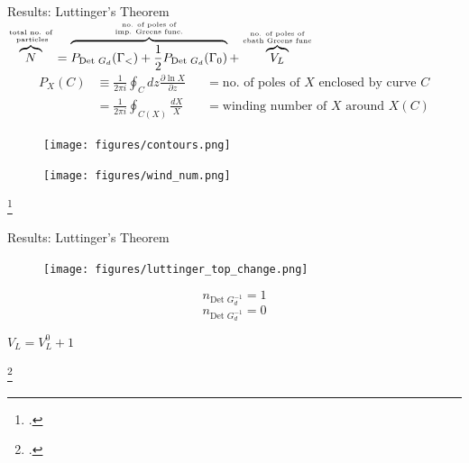 \documentclass[aspectratio=169]{beamer}
\begin{document}
\begin{frame}[noframenumbering]{Results: Luttinger's Theorem}
	\hspace*{\fill}	{\Large \(\overbrace{N}^{\text{total no. of}\atop{\text{ particles}}} = \overbrace{P_{\text{Det }G_d}(\Gamma_<) + \frac{1}{2}P_{\text{Det }G_d}(\Gamma_0)}^{\text{no. of poles of}\atop{\text{imp. Greens func.}}} + \overbrace{V_L}^{\text{no. of poles of}\atop{\text{cbath Greens func}}}\)}\hspace*{\fill}
\begin{equation*}\begin{aligned}
	P_X(C) &\equiv \frac{1}{2\pi i}\oint_C dz \frac{\partial{\ln X}}{\partial{z}} &&=\text{no. of poles of } X \text{ enclosed by curve }C \\
	       &= \frac{1}{2\pi i}\oint_{C(X)} \frac{dX}{X} &&= \text{winding number of } X \text{ around }X(C)
\end{aligned}\end{equation*}
\begin{minipage}{0.4\textwidth}
	\begin{figure}[htpb]
		\centering
		\texttt{[image: figures/contours.png]}
	\end{figure}
\end{minipage}
\hspace*{0.15\textwidth}
\begin{minipage}{0.4\textwidth}
	\begin{figure}[htpb]
		\centering
		\texttt{[image: figures/wind\_num.png]}
	\end{figure}
\end{minipage}
\footcite{seki}
\end{frame}

\begin{frame}[noframenumbering]{Results: Luttinger's Theorem}
\begin{minipage}{0.6\textwidth}
\begin{figure}[htpb]
	\centering
	\texttt{[image: figures/luttinger\_top\_change.png]}
\end{figure}
\end{minipage}
\begin{minipage}{0.39\textwidth}
	\vspace*{5pt}
	{\large \[n_{\text{Det }G_d^{-1}} = 1\]
	\vspace*{45pt}
	\[n_{\text{Det }G_d^{-1}} = 0\]}
\end{minipage}
\vspace*{10pt}
\begin{center}
{ \LARGE \(V_L = V_L^0 + 1\)}
\end{center}
\footcite{martin}
\end{frame}
\end{document}
